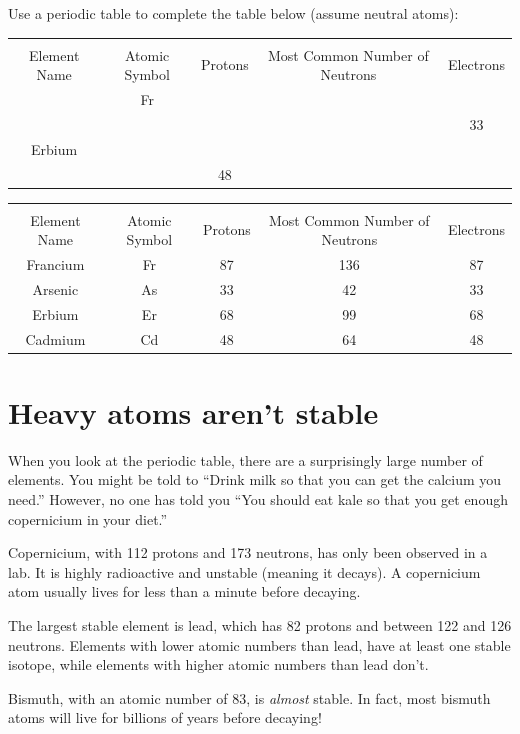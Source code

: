 \begin{Exercise}[title = {Determining Numbers of Subatomic Particles}, label = pne]
Use a periodic table to complete the table below (assume neutral atoms): %

\begin{tabular}{|c|c|c|c|c|}
\hline\\
Element Name & Atomic Symbol & Protons & Most Common Number of Neutrons & Electrons\\\hline
 & Fr & & & \\\hline
 & & & & 33\\\hline
 Erbium & & & & \\\hline
  & & 48 & & \\\hline
\end{tabular}
\end{Exercise}

\begin{Answer}[ref = pne]
\begin{tabular}{|c|c|c|c|c|}
\hline\\
Element Name & Atomic Symbol & Protons & Most Common Number of Neutrons & Electrons\\\hline
 Francium & Fr & 87 & 136 & 87 \\\hline
 Arsenic & As & 33 & 42 & 33 \\\hline
 Erbium & Er & 68 & 99 & 68 \\\hline
 Cadmium & Cd & 48 & 64 & 48 \\\hline
\end{tabular}
\end{Answer}




\section{Heavy atoms aren't stable}

When you look at the periodic table, there are a surprisingly large
number of elements. You might be told to ``Drink milk so that you can
get the calcium you need.'' However, no one has told you ``You should
eat kale so that you get enough copernicium in your diet.''

Copernicium, with 112 protons and 173 neutrons, has only been observed
 in a lab. It is highly radioactive and unstable (meaning it decays). A copernicium
atom usually lives for less than a minute before decaying.

The largest stable element is lead, which has 82 protons and between
122 and 126 neutrons. Elements with lower atomic numbers than lead,
have at least one stable isotope, while elements with higher atomic numbers
than lead don't.

Bismuth, with an atomic number of 83, is \textit{almost} stable. In fact, most
bismuth atoms will live for billions of years before decaying!
